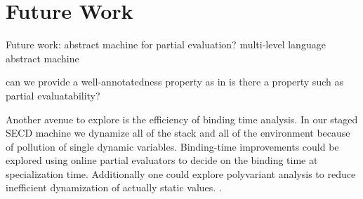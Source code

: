 \documentclass[fleqn]{article}
\theoremstyle{definition}
\begin{document}
\section{Future Work}
Future work:
abstract machine for partial evaluation? multi-level language abstract machine

can we provide a well-annotatedness property as in \cite{gomard1991partial}
is there a property such as partial evaluatability?

Another avenue to explore is the efficiency of binding time analysis. In our staged SECD machine we dynamize all of the stack and all of the environment because of pollution of single dynamic variables. Binding-time improvements could be explored using online partial evaluators to decide on the binding time at specialization time. Additionally one could explore polyvariant analysis to reduce inefficient dynamization of actually static values. \cite{danvy1995essence}.

\end{document}
